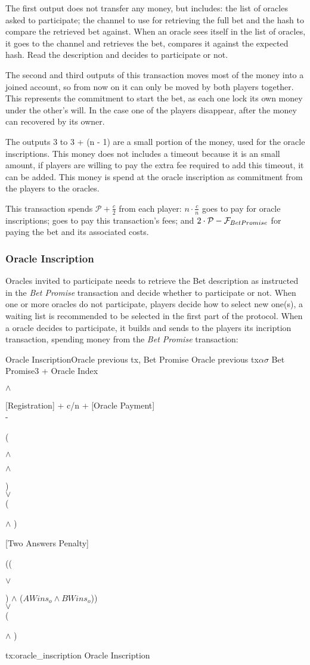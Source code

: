 The first output does not transfer any money, but includes: the list of oracles
  asked to participate; the channel to use for retrieving the full bet and the
  hash to compare the retrieved bet against.
When an oracle sees itself in the list of oracles, it goes to the channel and
  retrieves the bet, compares it against the expected hash.
Read the description and decides to participate or not.

The second and third outputs of this transaction moves most of the money into
  a joined account, so from now on it can only be moved by both players
  together.
This represents the commitment to start the bet, as each one lock its own money
  under the other's will.
In the case one of the players disappear, after  the money can
  recovered by its owner.

The outputs 3 to 3 + (n - 1) are a small portion of the money, used for the
  oracle inscriptions.
This money does not includes a timeout because it is an small amount, if players
  are willing to pay the extra fee required to add this timeout, it can be
  added.
This money is spend at the oracle inscription as commitment from the players to
  the oracles.

This transaction spends $\mathcal{P} + \frac{c}{2}$ from each player:
  $ n \cdot \frac{c}{n}$ goes to pay for oracle inscriptions; 
  goes to pay this transaction's fees; and
  $2 \cdot \mathcal{P} - \mathcal{F}_{Bet Promise} $ for paying the bet and its
  associated costs.

\subsubsection{Oracle Inscription}
Oracles invited to participate needs to retrieve the Bet description as
  instructed in the \textit{Bet Promise} transaction and decide whether to
  participate or not.
When one or more oracles do not participate, players decide how to select new
  one(s), a waiting list is recommended to be selected in the first part of the
  protocol.
When a oracle decides to participate, it builds and sends to the players its
  incription transaction, spending money from the \textit{Bet Promise}
  transaction:

\transaction%
    {Oracle Inscription}{Oracle previous tx, Bet Promise}
    {Oracle previous tx}{$\alpha$}{$\sigma$}
    {Bet Promise}{3 + Oracle Index}{\signature{A} $\wedge$ \signature{B}}
    \stopinputs
    {[Registration] + c/n + [Oracle Payment] \\ - }
        {(\signature{Oracle} $\wedge$ \signature{A} $\wedge$ \signature{B}) \\
            $\vee$ \\
         (\signature{Oracle} $\wedge$ )}
    {[Two Answers Penalty]}{((\signature{A} $\vee$ \signature{B}) $\wedge$ %
                             ($AWins_o \wedge BWins_o$)) \\
                           $\vee$ \\
                       (\signature{Oracle} $\wedge$ )}
    \stopoutputs
    {tx:oracle_inscription}
    {Oracle Inscription}

